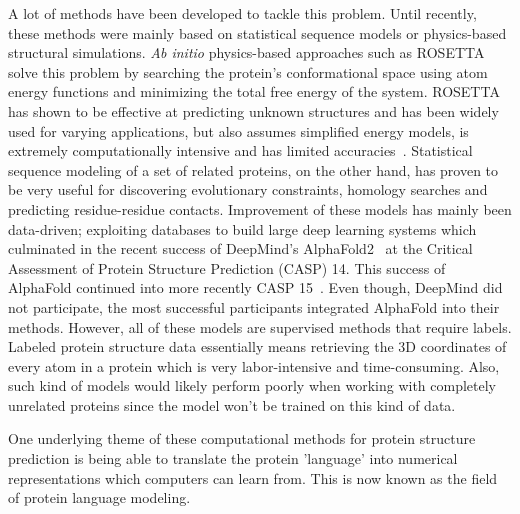 A lot of methods have been developed to tackle this problem. Until recently, these methods were mainly based on statistical sequence models or physics-based structural simulations. \textit{Ab initio} physics-based approaches such as ROSETTA~\cite{rosetta} solve this problem by searching the protein's conformational space using atom energy functions and minimizing the total free energy of the system. ROSETTA has shown to be effective at predicting unknown structures and has been widely used for varying applications, but also assumes simplified energy models, is extremely computationally intensive and has limited accuracies~\cite{review}. Statistical sequence modeling of a set of related proteins, on the other hand, has proven to be very useful for discovering evolutionary constraints, homology searches and predicting residue-residue contacts. Improvement of these models has mainly been data-driven; exploiting databases to build large deep learning systems which culminated in the recent success of DeepMind's AlphaFold2~\cite{alphafold2} at the Critical Assessment of Protein Structure Prediction (CASP) 14. This success of AlphaFold continued into more recently CASP 15~\cite{casp15}. Even though, DeepMind did not participate, the most successful participants integrated AlphaFold into their methods. However, all of these models are supervised methods that require labels. Labeled protein structure data essentially means retrieving the 3D coordinates of every atom in a protein which is very labor-intensive and time-consuming. Also, such kind of models would likely perform poorly when working with completely unrelated proteins since the model won't be trained on this kind of data. 

One underlying theme of these computational methods for protein structure prediction is being able to translate the protein 'language' into numerical representations which computers can learn from. This is now known as the field of protein language modeling.

